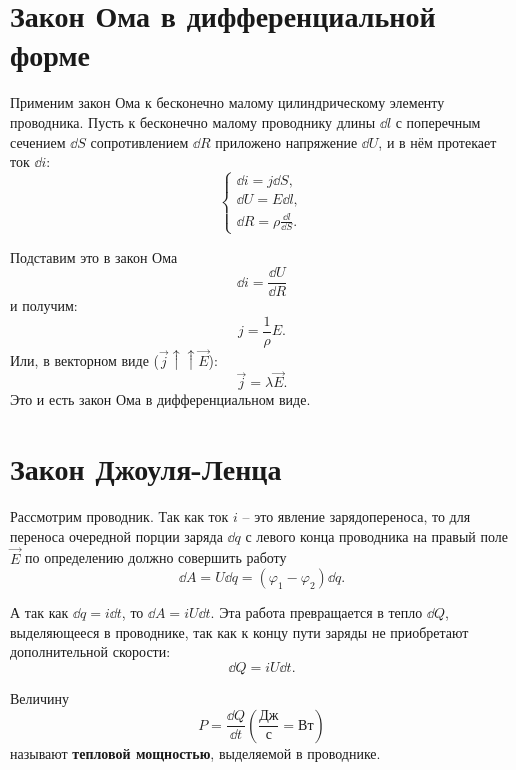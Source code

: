 \section{Закон Ома в дифференциальной форме}

    Применим закон Ома к бесконечно малому цилиндрическому элементу проводника.
    Пусть к бесконечно малому проводнику длины \( \dd l \) с поперечным
    сечением \( \dd S \) сопротивлением \( \dd R \) приложено напряжение
    \( \dd U \), и в нём протекает ток \( \dd i \):
    \[
        \left\{
        \begin{array}{l}
            \dd i = j\dd S, \\
            \dd U = E\dd l, \\
            \dd R = \rho\frac{\dd l}{\dd S}.
        \end{array}
        \right.
    \]
    
    Подставим это в закон Ома
    \[
        \dd i = \frac{\dd U}{\dd R}
    \]
    и получим:
    \[
        j = \frac{1}{\rho} E.
    \]
    Или, в векторном виде (\( \vec{j} \uparrow\uparrow \vec{E} \)):
    \begin{equation}
        \vec{j} = \lambda \vec{E}.
    \end{equation}
    Это и есть закон Ома в дифференциальном виде.
    
\section{Закон Джоуля-Ленца}

    Рассмотрим проводник. Так как ток \( i \) -- это явление зарядопереноса,
    то для переноса очередной порции заряда \( \dd q \) с левого конца
    проводника на правый поле \( \vec{E} \) по определению должно совершить
    работу
    \[
        \dd A = U\dd q = (\varphi_1 - \varphi_2)\dd q.
    \]
    
    А так как \( \dd q = i\dd t \), то \( \dd A = iU\dd t \). Эта работа
    превращается в тепло \( \dd Q \), выделяющееся в проводнике, так как к концу
    пути заряды не приобретают дополнительной скорости:
    \begin{equation}
        \dd Q = iU\dd t.
        \label{eq:dQ}
    \end{equation}
    
    \begin{definition}
        Величину
        \[
            P = \frac{\dd Q}{\dd t} \left(\frac{\text{Дж}}{\text{с}} =
            \text{Вт}\right)
        \]
        называют \textbf{тепловой мощностью}, выделяемой в проводнике.
    \end{definition}
    
